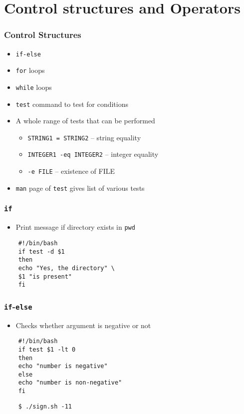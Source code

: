 \documentclass[12pt,compress]{beamer}
\begin{document}
\section{Control structures and Operators}
\begin{frame}[fragile]
  \frametitle{Control Structures}
  \begin{itemize}
  \item \texttt{if-else}
  \item \texttt{for} loops
  \item \texttt{while} loops
  \end{itemize}
  \begin{itemize}
  \item \texttt{test} command to test for conditions
  \item A whole range of tests that can be performed
    \begin{itemize}
    \item \texttt{STRING1 = STRING2} -- string equality
    \item \texttt{INTEGER1 -eq INTEGER2} -- integer equality
    \item \texttt{-e FILE} -- existence of FILE 
    \end{itemize}
  \item \texttt{man} page of \texttt{test} gives list of various tests
  \end{itemize}
\end{frame}

\begin{frame}[fragile]
  \frametitle{\texttt{if}}
  \begin{itemize}
  \item Print message if directory exists in \texttt{pwd}
  \end{itemize}
  \begin{lstlisting}
    #!/bin/bash
    if test -d $1
    then
    echo "Yes, the directory" \
    $1 "is present"
    fi
  \end{lstlisting} %
\end{frame}

\begin{frame}[fragile]
  \frametitle{\texttt{if}-\texttt{else}}
  \begin{itemize}
  \item Checks whether argument is negative or not
  \end{itemize}
  \begin{lstlisting}
    #!/bin/bash
    if test $1 -lt 0
    then
    echo "number is negative"
    else
    echo "number is non-negative"
    fi
  \end{lstlisting} %
  \begin{lstlisting}
    $ ./sign.sh -11
  \end{lstlisting} %
\end{frame}
\end{document}
